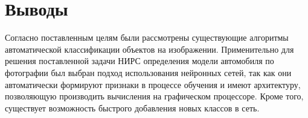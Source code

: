 \documentclass[a4paper,14pt]{extarticle} %
\begin{document}
\section{Выводы}
\hspace{\parindent} Согласно поставленным целям были рассмотрены существующие алгоритмы автоматической классификации объектов на изображении. Применительно для решения поставленной задачи НИРС определения модели автомобиля по фотографии был выбран подход использования нейронных сетей, так как они автоматически формируют признаки в процессе обучения и имеют архитектуру, позволяющую производить вычисления на графическом процессоре. Кроме того, существует возможность быстрого добавления новых классов в сеть.

%
\newpage
\begin{flushleft}
\end{flushleft}
\end{document}
